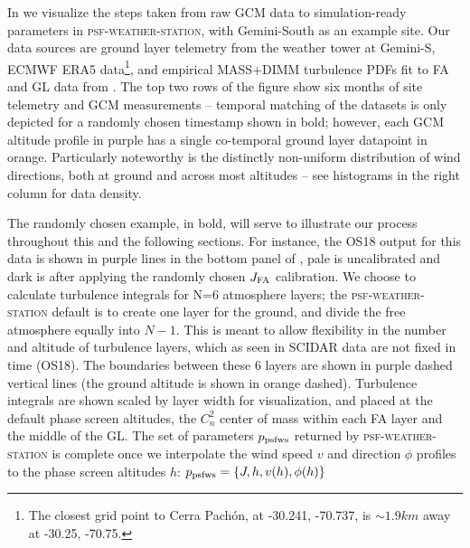\documentclass[twocolumn]{aastex631}
\newcommand{\psfws}{\textsc{psf-weather-station}\xspace}
\newcommand{\osborn}{OS18\xspace}
\begin{document}
In  we visualize the steps taken from raw GCM data to simulation-ready parameters in \psfws, with Gemini-South as an example site.
Our data sources are ground layer telemetry from the weather tower at Gemini-S, ECMWF ERA5 data\footnote{The closest grid point to Cerra Pachón, at -30.241, -70.737, is $\sim 1.9\unit{km}$ away at -30.25, -70.75.}, and empirical MASS+DIMM turbulence PDFs fit to FA and GL data from \citep{tokovinin_model_2005}. 
The top two rows of the figure show six months of site telemetry and GCM measurements -- temporal matching of the datasets is only depicted for a randomly chosen timestamp shown in bold; however, each GCM altitude profile in purple has a single co-temporal ground layer datapoint in orange.
Particularly noteworthy is the distinctly non-uniform distribution of wind directions, both at ground and across most altitudes -- see histograms in the right column for data density.

The randomly chosen example, in bold, will serve to illustrate our process throughout this and the following sections.
For instance, the \osborn output for this data is shown in purple lines in the bottom panel of , pale is uncalibrated and dark is after applying the randomly chosen $J_{\rm FA}$ calibration.
We choose to calculate turbulence integrals for N=6 atmosphere layers; the \psfws default is to create one layer for the ground, and divide the free atmosphere equally into $N-1$. 
This is meant to allow flexibility in the number and altitude of turbulence layers, which as seen in SCIDAR data are not fixed in time (\osborn).
The boundaries between these 6 layers are shown in purple dashed vertical lines (the ground altitude is shown in orange dashed).
Turbulence integrals are shown scaled by layer width for visualization, and placed at the default phase screen altitudes, \ie the $C_n^2$ center of mass within each FA layer and the middle of the GL.
The set of parameters $p_{\rm psfws}$ returned by \psfws is complete once we interpolate the wind speed $v$ and direction $\phi$ profiles to the phase screen altitudes $h$: $p_{\rm psfws} = \{J, h, v(h), \phi(h)\}$
\end{document}
